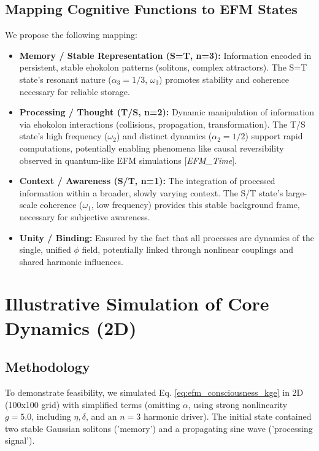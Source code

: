 \documentclass[11pt]{article}
\newcommand{\citep}[1]{[\textit{#1}]} %
\begin{document}
\subsection{Mapping Cognitive Functions to EFM States}
We propose the following mapping:
\begin{itemize}
    \item \textbf{Memory / Stable Representation (S=T, n=3):} Information encoded in persistent, stable ehokolon patterns (solitons, complex attractors). The S=T state's resonant nature (\(\alpha_3=1/3\), \(\omega_3\)) promotes stability and coherence necessary for reliable storage.
    \item \textbf{Processing / Thought (T/S, n=2):} Dynamic manipulation of information via ehokolon interactions (collisions, propagation, transformation). The T/S state's high frequency (\(\omega_2\)) and distinct dynamics (\(\alpha_2=1/2\)) support rapid computations, potentially enabling phenomena like causal reversibility observed in quantum-like EFM simulations \citep{EFM_Time}.
    \item \textbf{Context / Awareness (S/T, n=1):} The integration of processed information within a broader, slowly varying context. The S/T state's large-scale coherence (\(\omega_1\), low frequency) provides this stable background frame, necessary for subjective awareness.
    \item \textbf{Unity / Binding:} Ensured by the fact that all processes are dynamics of the single, unified \(\phi\) field, potentially linked through nonlinear couplings and shared harmonic influences.
\end{itemize}

\section{Illustrative Simulation of Core Dynamics (2D)}

\subsection{Methodology}
To demonstrate feasibility, we simulated Eq. \ref{eq:efm_consciousness_kge} in 2D (100x100 grid) with simplified terms (omitting \(\alpha\), using strong nonlinearity \(g=5.0\), including \(\eta, \delta\), and an \(n=3\) harmonic driver). The initial state contained two stable Gaussian solitons ('memory') and a propagating sine wave ('processing signal').
\end{document}
